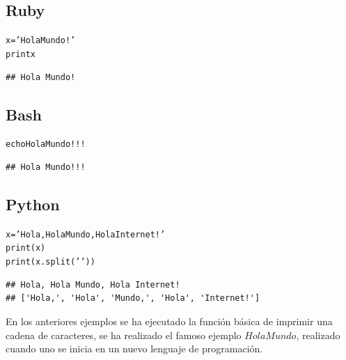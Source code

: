 \documentclass{article}\usepackage[]{graphicx}\usepackage[]{color}
\makeatletter
\newenvironment{kframe}{%
 \def\at@end@of@kframe{}%
 \ifinner\ifhmode%
  \def\at@end@of@kframe{\end{minipage}}%
  \begin{minipage}{\columnwidth}%
 \fi\fi%
 \def\FrameCommand##1{\hskip\@totalleftmargin \hskip-\fboxsep
 \colorbox{shadecolor}{##1}\hskip-\fboxsep
     \hskip-\linewidth \hskip-\@totalleftmargin \hskip\columnwidth}%
 \MakeFramed {\advance\hsize-\width
   \@totalleftmargin\z@ \linewidth\hsize
   \@setminipage}}%
 {\par\unskip\endMakeFramed%
 \at@end@of@kframe}
\newenvironment{knitrout}{}{} %
\makeatother
\begin{document}
\subsection*{Ruby}
\begin{knitrout}
\color{fgcolor}\begin{kframe}
\begin{alltt}
x = 'Hola Mundo!'
print x
\end{alltt}

\begin{verbatim}
## Hola Mundo!
\end{verbatim}
\end{kframe}
\end{knitrout}

\subsection*{Bash}
\begin{knitrout}
\color{fgcolor}\begin{kframe}
\begin{alltt}
echo Hola Mundo!!!
\end{alltt}

\begin{verbatim}
## Hola Mundo!!!
\end{verbatim}
\end{kframe}
\end{knitrout}

\subsection*{Python}
\begin{knitrout}
\color{fgcolor}\begin{kframe}
\begin{alltt}
x = 'Hola, Hola Mundo, Hola Internet!'
print(x)
print(x.split(' '))
\end{alltt}

\begin{verbatim}
## Hola, Hola Mundo, Hola Internet!
## ['Hola,', 'Hola', 'Mundo,', 'Hola', 'Internet!']
\end{verbatim}
\end{kframe}
\end{knitrout}

En los anteriores ejemplos se ha ejecutado la función básica de imprimir una cadena de caracteres, se ha realizado el famoso ejemplo $Hola Mundo$, realizado cuando uno se inicia en un nuevo lenguaje de programación.
\end{document}
